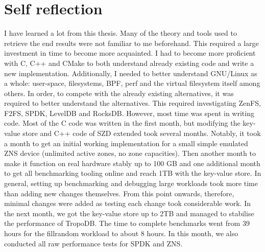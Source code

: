 \section{Self reflection}
I have learned a lot from this thesis. Many of the theory and tools used to retrieve the end results were not familiar to me beforehand. This required a large investment in time to become more acquainted. I had to become more proficient with C, C++ and CMake to both understand already existing code and write a new implementation. Additionally, I needed to better understand GNU/Linux as a whole: user-space, filesystems, BPF, perf and the virtual filesystem itself among others. In order, to compete with the already existing alternatives, it was required to better understand the alternatives. This required investigating ZenFS, F2FS, SPDK, LevelDB and RocksDB. However, most time was spent in writing code. Most of the C code was written in the first month, but modifying the key-value store and C++ code of SZD extended took several months. Notably, it took a month to get an initial working implementation for a small simple emulated ZNS device (unlimited active zones, no zone capacities). Then another month to make it function on real hardware stably up to 100 GB and one additional month to get all benchmarking tooling online and reach 1TB with the key-value store. In general, setting up benchmarking and debugging large workloads took more time than adding new changes themselves. From this point onwards, therefore, minimal changes were added as testing each change took considerable work. In the next month, we got the key-value store up to 2TB and managed to stabilise the performance of TropoDB. The time to complete benchmarks went from 39 hours for the fillrandom workload to about 8 hours. In this month, we also conducted all raw performance tests for SPDK and ZNS.

